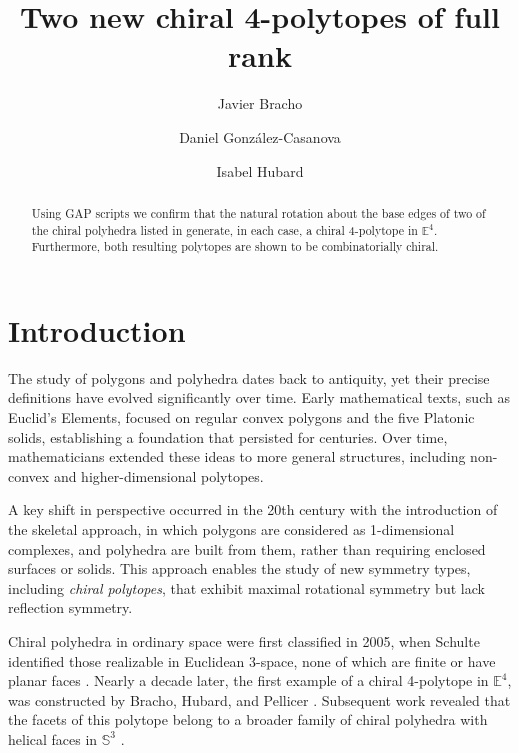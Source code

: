 \documentclass{amsart}
\begin{document}
\title{Two new chiral 4-polytopes of full rank}
\author{Javier Bracho} 
\address{Institute of Mathematics, National Autonomous University of Mexico (IM UNAM), 04510 Mexico City, Mexico}
\author{Daniel Gonz\'alez-Casanova}
\address{Institute of Mathematics, National Autonomous University of Mexico (IM UNAM), 04510 Mexico City, Mexico}
\author{Isabel Hubard}
\address{Institute of Mathematics, National Autonomous University of Mexico (IM UNAM), 04510 Mexico City, Mexico}

\begin{abstract}
Using GAP scripts we confirm that the natural rotation 
about the base edges of two of the chiral polyhedra listed in \cite{petcox} 
generate, in each case, a chiral 4-polytope in $\mathbb{E}^4$.
Furthermore, both resulting polytopes are shown to be
combinatorially chiral. 
\end{abstract}

\maketitle 

\listoftodos\relax

\section{Introduction}
\label{section-introduction}

The study of polygons and polyhedra dates back to antiquity, yet their precise
definitions have evolved significantly over time. Early mathematical texts, such
as Euclid’s Elements, focused on regular convex polygons and the five Platonic
solids, establishing a foundation that persisted for centuries. Over time,
mathematicians extended these ideas to more general structures, including
non-convex and higher-dimensional polytopes.

A key shift in perspective occurred in the 20th century with the introduction of
the skeletal approach, in which polygons are considered as 1-dimensional
complexes, and polyhedra are built from them, rather than requiring enclosed
surfaces or solids.  This approach enables the study of new symmetry types,
including {\em chiral polytopes}, that exhibit maximal rotational symmetry but
lack reflection symmetry. 

Chiral polyhedra in ordinary space were first  classified in 2005, when Schulte
identified those realizable in Euclidean 3-space, none of which are finite or
have planar faces \cite{chiral-polyhedra-i,chiral-polyhedra-ii}. Nearly a decade
later, the first example of a chiral 4-polytope in $\mathbb{E}^4$, was
constructed by Bracho, Hubard, and Pellicer \cite{rolis-cube}.  Subsequent work
revealed that the facets of this polytope belong to a broader family of chiral
polyhedra with helical faces in $\mathbb{S}^3$ \cite{petcox}.
\end{document}

